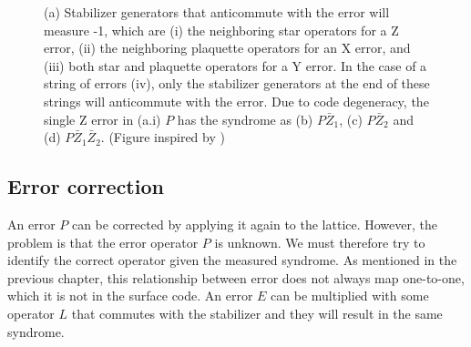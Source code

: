 \begin{figure}
  \hspace{1cm}
  \caption{(a) Stabilizer generators that anticommute with the error will measure -1, which are (i) the neighboring star operators for a Z error, (ii) the neighboring plaquette operators for an X error, and (iii) both star and plaquette operators for a Y error. In the case of a string of errors (iv), only the stabilizer generators at the end of these strings will anticommute with the error. Due to code degeneracy, the single Z error in (a.i) $P$ has the syndrome as (b) $P\bar{Z}_1$, (c) $P\bar{Z}_2$ and (d) $P\bar{Z}_1\bar{Z}_2$. (Figure inspired by \cite{browne})}\label{sf:fig_degenerate}
\end{figure}

\subsection{Error correction}
An error $P$ can be corrected by applying it again to the lattice. However, the problem is that the error operator $P$ is unknown. We must therefore try to identify the correct operator given the measured syndrome. As mentioned in the previous chapter, this relationship between error does not always map one-to-one, which it is not in the surface code. An error $E$ can be multiplied with some operator $L$ that commutes with the stabilizer and they will result in the same syndrome.

